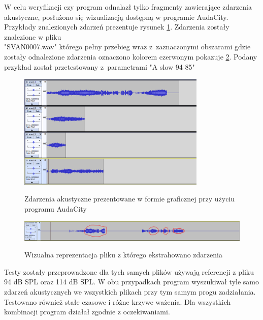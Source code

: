 \documentclass[eng,printmode]{mgr}
\begin{document}
W celu weryfikacji czy program odnalazł tylko fragmenty zawierające zdarzenia akustyczne, posłużono się wizualizacją dostępną w programie AudaCity. Przykłady znalezionych zdarzeń prezentuje rysunek \ref{znalezione_zdarzenia}. Zdarzenia zostały znalezione w pliku \\"SVAN0007.wav" którego pełny przebieg wraz z~zaznaczonymi obszarami  gdzie zostały odnalezione zdarzenia oznaczono kolorem czerwonym pokazuje \ref{przebieg}. Podany przykład został przetestowany z~parametrami "A slow 94 85"

\begin{figure}[hbtp]
\caption{Zdarzenia akustyczne prezentowane w formie graficznej przy użyciu programu AudaCity}
\centering
\includegraphics[width=0.8\textwidth]{zdarzeniaAuda.PNG}
\label{znalezione_zdarzenia}
\end{figure}

\begin{figure}[hbtp]
\caption{Wizualna reprezentacja pliku z którego ekstrahowano zdarzenia}
\centering
\includegraphics[angle=90,origin=c, scale = 0.6]{oryginalAuda.PNG}
\label{przebieg}
\end{figure}

Testy zostały przeprowadzone dla tych samych plików używają referencji z pliku 94 dB SPL oraz 114 dB SPL. W obu przypadkach program wyszukiwał tyle samo zdarzeń akustycznych we wszystkich plikach przy tym samym progu zadziałania. Testowano również stałe czasowe i różne krzywe ważenia. Dla wszystkich kombinacji program działał zgodnie z oczekiwaniami. 

\appendix
{} %

\listoffigures
\lstlistoflistings
\end{document}
